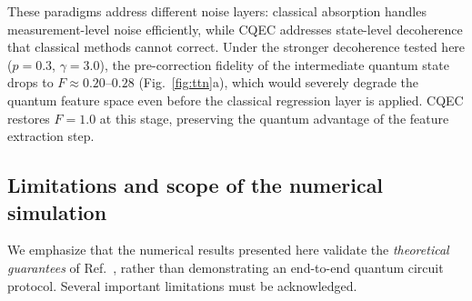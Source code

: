 \documentclass[prx,twocolumn,superscriptaddress,longbibliography,floatfix]{revtex4-2}
\begin{document}
These paradigms address different noise layers: classical absorption handles measurement-level noise efficiently, while CQEC addresses state-level decoherence that classical methods cannot correct.
Under the stronger decoherence tested here ($p = 0.3$, $\gamma = 3.0$), the pre-correction fidelity of the intermediate quantum state drops to $F \approx 0.20$--$0.28$ (Fig.~\ref{fig:ttn}a), which would severely degrade the quantum feature space even before the classical regression layer is applied.
CQEC restores $F = 1.0$ at this stage, preserving the quantum advantage of the feature extraction step.


\subsection{Limitations and scope of the numerical simulation}
\label{sec:limitations}

We emphasize that the numerical results presented here validate the \emph{theoretical guarantees} of Ref.~\cite{Shiraishi2024}, rather than demonstrating an end-to-end quantum circuit protocol.
Several important limitations must be acknowledged.
\end{document}
